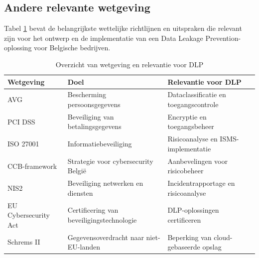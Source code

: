 
\subsection{Andere relevante wetgeving}%

Tabel \ref{tab:wetgeving_dlp} bevat de belangrijkste wettelijke richtlijnen en uitspraken die relevant zijn voor het ontwerp en de implementatie van een Data Leakage Prevention-oplossing voor Belgische bedrijven.


  
  \begin{table}[h]
    \centering
    \small
    \begin{tabular}{p{4cm} p{5cm} p{6cm}}
        \toprule
        \textbf{Wetgeving} & \textbf{Doel} & \textbf{Relevantie voor DLP} \\
        \midrule
        AVG & Bescherming persoonsgegevens & Dataclassificatie en toegangscontrole \\
        PCI DSS & Beveiliging van betalingsgegevens & Encryptie en toegangsbeheer \\
        ISO 27001 & Informatiebeveiliging & Risicoanalyse en ISMS-implementatie \\
        CCB-framework & Strategie voor cybersecurity België & Aanbevelingen voor risicobeheer \\
        NIS2 & Beveiliging netwerken en diensten & Incidentrapportage en risicoanalyse \\
        EU Cybersecurity Act & Certificering van beveiligingstechnologie & DLP-oplossingen certificeren \\
        Schrems II & Gegevensoverdracht naar niet-EU-landen & Beperking van cloud-gebaseerde opslag \\
        \bottomrule
    \end{tabular}
    \caption{Overzicht van wetgeving en relevantie voor DLP}
    \label{tab:wetgeving_dlp}
\end{table}



